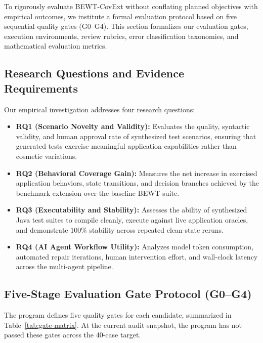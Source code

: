 \documentclass[pdflatex,sn-mathphys-num]{sn-jnl}
\begin{document}
To rigorously evaluate BEWT-CovExt without conflating planned objectives with empirical outcomes, we institute a formal evaluation protocol based on five sequential quality gates (G0--G4). This section formalizes our evaluation gates, execution environments, review rubrics, error classification taxonomies, and mathematical evaluation metrics.

\subsection{Research Questions and Evidence Requirements}

Our empirical investigation addresses four research questions:
\begin{itemize}
    \item \textbf{RQ1 (Scenario Novelty and Validity):} Evaluates the quality, syntactic validity, and human approval rate of synthesized test scenarios, ensuring that generated tests exercise meaningful application capabilities rather than cosmetic variations.
    \item \textbf{RQ2 (Behavioral Coverage Gain):} Measures the net increase in exercised application behaviors, state transitions, and decision branches achieved by the benchmark extension over the baseline BEWT suite.
    \item \textbf{RQ3 (Executability and Stability):} Assesses the ability of synthesized Java test suites to compile cleanly, execute against live application oracles, and demonstrate $100\%$ stability across repeated clean-state reruns.
    \item \textbf{RQ4 (AI Agent Workflow Utility):} Analyzes model token consumption, automated repair iterations, human intervention effort, and wall-clock latency across the multi-agent pipeline.
\end{itemize}

\subsection{Five-Stage Evaluation Gate Protocol (G0--G4)}

The program defines five quality gates for each candidate, summarized in Table~\ref{tab:gate-matrix}. At the current audit snapshot, the program has not passed these gates across the 40-case target.
\end{document}
